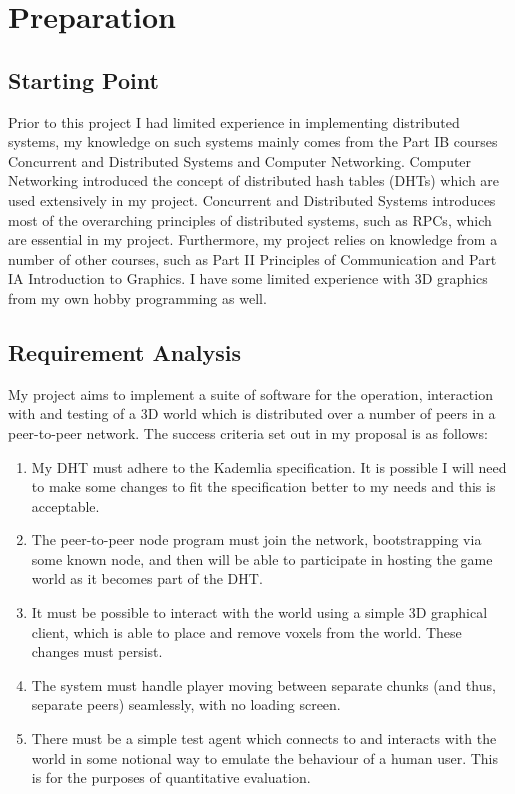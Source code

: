\documentclass[10pt,twoside,notitlepage,a4paper]{report}
\begin{document}
	\cleardoublepage
	\chapter{Preparation}
	
	\section{Starting Point}
	Prior to this project I had limited experience in implementing distributed systems, my knowledge on such systems mainly comes from the Part IB courses Concurrent and Distributed Systems and Computer Networking. Computer Networking introduced the concept of distributed hash tables (DHTs) which are used extensively in my project. Concurrent and Distributed Systems introduces most of the overarching principles of distributed systems, such as RPCs, which are essential in my project. Furthermore, my project relies on knowledge from a number of other courses, such as Part II Principles of Communication and Part IA Introduction to Graphics. I have some limited experience with 3D graphics from my own hobby programming as well.
	
	\section{Requirement Analysis}
	My project aims to implement a suite of software for the operation, interaction with and testing of a 3D world which is distributed over a number of peers in a peer-to-peer network. The success criteria set out in my proposal is as follows:
	
	\begin{enumerate}
		\item My DHT must adhere to the Kademlia specification. It is possible I will need to make some changes to fit the specification better to my needs and this is acceptable.
		\item The peer-to-peer node program must join the network, bootstrapping via some known node, and then will be able to participate in hosting the game world as it becomes part of the DHT.
		\item It must be possible to interact with the world using a simple 3D graphical client, which is able to place and remove voxels from the world. These changes must persist.
		\item The system must handle player moving between separate chunks (and thus, separate peers) seamlessly, with no loading screen.
		\item There must be a simple test agent which connects to and interacts with the world in some notional way to emulate the behaviour of a human user. This is for the purposes of quantitative evaluation.
	\end{enumerate}
\end{document}
